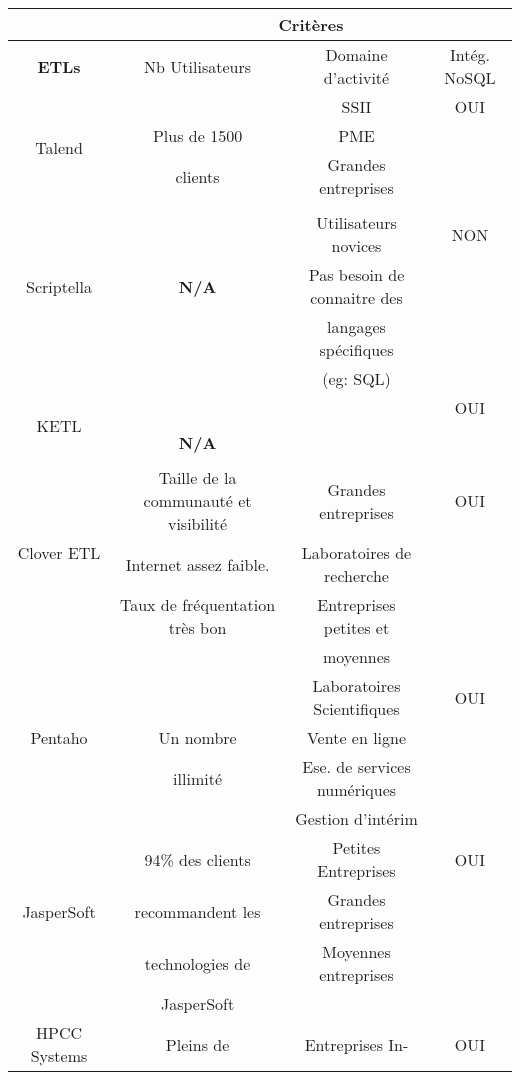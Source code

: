 \documentclass[12pt,a4wide,twoside]{report}
\begin{document}
			\begin{table}
				\begin{center}
					\begin{tabular}{|c|c|c|c|}
					\hline
					 &\multicolumn{3}{c|}{\textbf{Critères}}\\
					\hline
					\textbf{ETLs}&Nb Utilisateurs&Domaine d'activité&Intég. NoSQL\\
					\hline
					\multirow{3}{2cm}{Talend}&&SSII&OUI \\
					& Plus de 1500 \cite{misc3}&PME &\\
					&clients &Grandes entreprises &\\
					& & & \\
					\hline
					\multirow{3}{2cm}{Scriptella}& &Utilisateurs novices &NON \\
					&\textbf{N/A} &Pas besoin de connaitre des&\\
					& & langages spécifiques &\\
					& &(eg: SQL) &\\
					\hline
					\multirow{3}{2cm}{KETL}& & & OUI \\
					& & &\\
					&\textbf{N/A} & &\\
					& & & \\
					\hline
					\multirow{3}{2cm}{Clover ETL}&Taille de la communauté et visibilité&Grandes entreprises &OUI \\
					&Internet assez faible. & Laboratoires de recherche &\\
					&Taux de fréquentation très bon &Entreprises petites et  &\\
					& &moyennes & \\
					\hline
					\multirow{3}{2cm}{Pentaho}& &Laboratoires Scientifiques &OUI \\
					&Un nombre &Vente en ligne &\\
					&illimité \cite{misc4} &Ese. de services numériques &\\
					& &Gestion d'intérim & \\
					\hline					
					\multirow{3}{2cm}{JasperSoft}& 94\% des clients &Petites Entreprises & OUI \\
					&recommandent les &Grandes entreprises &\\
					& technologies de &Moyennes entreprises &\\
					&JasperSoft \cite{misc5} & & \\				
					\hline					
					\multirow{3}{2cm}{HPCC Systems}& Pleins de &Entreprises In- &OUI \\

\end{tabular}
\end{center}
\end{table}
\end{document}
